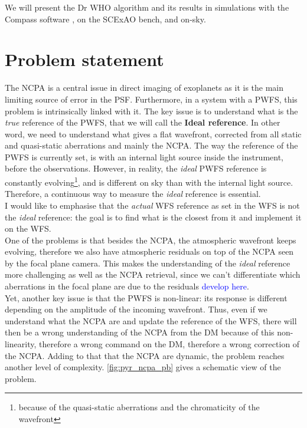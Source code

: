 \documentclass[twocolumn]{aastex62}
\begin{document}
We will present the Dr WHO algorithm and its results in simulations with the Compass software \citep{Compass}, on the SCExAO bench, and on-sky.\\


\section{Problem statement}
The NCPA is a central issue in direct imaging of exoplanets as it is the main limiting source of error in the PSF. Furthermore, in a system with a PWFS, this problem is intrinsically linked with it. The key issue is to understand what is the \textit{true} reference of the PWFS, that we will call the \textbf{Ideal reference}. In other word, we need to understand what gives a flat wavefront, corrected from all static and quasi-static aberrations and mainly the NCPA. 
The way the reference of the PWFS is currently set, is with an internal light source inside the instrument, before the observations. However, in reality, the \textit{ideal} PWFS reference is constantly evolving\footnote{because of the quasi-static aberrations and the chromaticity of the wavefront}, and is different on sky than with the internal light source. Therefore, a continuous way to measure the \textit{ideal} reference is essential. \\
I would like to emphasise that the \textit{actual} WFS reference as set in the WFS is not the \textit{ideal} reference: the goal is to find what is the closest from it and implement it on the WFS.\\ 
One of the problems is that besides the NCPA, the atmospheric wavefront keeps evolving, therefore we also have atmospheric residuals on top of the NCPA seen by the focal plane camera. This makes the understanding of the \textit{ideal} reference more challenging as well as the NCPA retrieval, since we can't differentiate which aberrations in the focal plane are due to the residuals \textcolor{blue}{develop here}. \\
Yet, another key issue is that the PWFS is non-linear: its response is different depending on the amplitude of the incoming wavefront. Thus, even if we understand what the NCPA are and update the reference of the WFS, there will then be a wrong understanding of the NCPA from the DM because of this non-linearity, therefore a wrong command on the DM, therefore a wrong correction of the NCPA. Adding to that that the NCPA are dynamic, the problem reaches another level of complexity. \ref{fig:pyr_ncpa_pb} gives a schematic view of the problem. 
\end{document}
